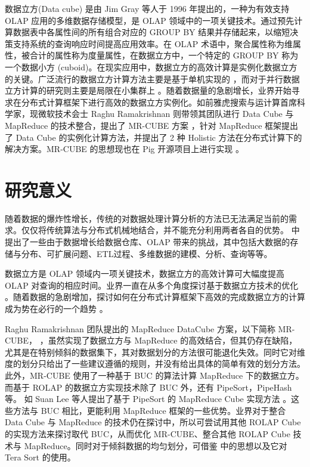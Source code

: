 数据立方(Data cube) \cite{gray1997data}是由 Jim Gray 等人于 1996 年提出的，一种为有效支持 OLAP 应用的多维数据存储模型，是 OLAP 领域中的一项关键技术。通过预先计算数据表中各属性间的所有组合对应的 GROUP BY 结果并存储起来，以缩短决策支持系统的查询响应时间提高应用效率。在 OLAP 术语中，聚合属性称为维属性，被合计的属性称为度量属性，在数据立方中，一个特定的 GROUP BY 称为一个数据小方 (cuboid)。在现实应用中，数据立方的高效计算是实例化数据立方的关键。广泛流行的数据立方计算方法主要是基于单机实现的 \cite{agarwal1996computation} \cite{beyer1999bottom}，而对于并行数据立方计算的研究则主要是局限在小集群上 \cite{ng2001iceberg} \cite{dehne2002parallelizing}。随着数据量的急剧增长，业界开始寻求在分布式计算框架下进行高效的数据立方实例化。如前雅虎搜索与运计算首席科学家，现微软技术会士 Raghu Ramakrishnan 则带领其团队进行 Data Cube 与 MapReduce 的技术整合，提出了 MR-CUBE 方案 \cite{nandi2012data} \cite{nandi2011distributed}，针对 MapReduce 框架提出了 Data Cube 的实例化计算方法，并提出了 2 种 Holistic 方法在分布式计算下的解决方案。MR-CUBE 的思想现也在 Pig 开源项目上进行实现 \cite{mrcubepig}。

\section{研究意义}

随着数据的爆炸性增长，传统的对数据处理计算分析的方法已无法满足当前的需求。仅仅将传统算法与分布式机械地结合，并不能充分利用两者各自的优势。\cite{cuzzocrea2011analytics} \cite{cuzzocrea2013data} \cite{cuzzocrea2013big} 中提出了一些由于数据增长给数据仓库、OLAP 带来的挑战，其中包括大数据的存储与分布、可扩展问题、ETL过程、多维数据的建模、分析、查询等等。

数据立方是 OLAP 领域内一项关键技术，数据立方的高效计算可大幅度提高 OLAP 对查询的相应时间。业界一直在从多个角度探讨基于数据立方技术的优化 \cite{xin2003star} \cite{harinarayan1996implementing} \cite{zhao1997array} \cite{han2001efficient} \cite{wang2002condensed}。随着数据的急剧增加，探讨如何在分布式计算框架下高效的完成数据立方的计算成为势在必行的一个趋势 \cite{abello2011building} \cite{wang2010mapreducemerge} \cite{sergey2009applying} \cite{lee2012efficient} \cite{wang2013scalable}。

Raghu Ramakrishnan 团队提出的 MapReduce DataCube 方案，以下简称 MR-CUBE， \cite{nandi2012data} \cite{nandi2011distributed}，虽然实现了数据立方与 MapReduce 的高效结合，但其仍存在缺陷，尤其是在特别倾斜的数据集下，其对数据划分的方法很可能退化失效。同时它对维度的划分只给出了一些建议遵循的规则，并没有给出具体的简单有效的划分方法。此外，MR-CUBE 使用了一种基于 BUC \cite{beyer1999bottom} 的算法计算 MapReduce 下的数据立方。而基于 ROLAP 的数据立方实现技术除了 BUC 外，还有 PipeSort，PipeHash \cite{agarwal1996computation} 等。 如 Suan Lee 等人提出了基于 PipeSort 的 MapReduce Cube 实现方法 \cite{lee2012efficient} 。这些方法与 BUC 相比，更能利用 MapReduce 框架的一些优势。业界对于整合 Data Cube 与 MapReduce 的技术仍在探讨中，所以可尝试用其他 ROLAP Cube 的实现方法来探讨取代 BUC，从而优化 MR-CUBE、整合其他 ROLAP Cube 技术与 MapReduce。同时对于倾斜数据的均匀划分，可借鉴 \cite{tao2013minimal} 中的思想以及它对 Tera Sort 的使用。



